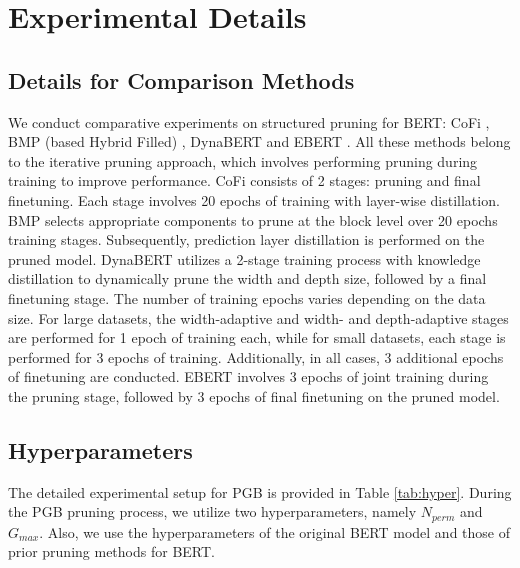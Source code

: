 \newpage

\setcounter{table}{0}
\setcounter{figure}{0}

\section{Experimental Details}\label{app:exdetail}
\subsection{Details for Comparison Methods}\label{app:compare}
We conduct comparative experiments on structured pruning for BERT: CoFi \cite{Xia}, BMP (based Hybrid Filled) \cite{block}, DynaBERT \cite{DynaBERT} and EBERT \cite{ebert}. All these methods belong to the iterative pruning approach, which involves performing pruning during training to improve performance. CoFi \cite{Xia} consists of 2 stages: pruning and final finetuning. Each stage involves 20 epochs of training with layer-wise distillation. BMP \cite{block} selects appropriate components to prune at the block level over 20 epochs training stages. Subsequently, prediction layer distillation is performed on the pruned model. DynaBERT \cite{DynaBERT} utilizes a 2-stage training process with knowledge distillation to dynamically prune the width and depth size, followed by a final finetuning stage. The number of training epochs varies depending on the data size. For large datasets, the width-adaptive and width- and depth-adaptive stages are performed for 1 epoch of training each, while for small datasets, each stage is performed for 3 epochs of training. Additionally, in all cases, 3 additional epochs of finetuning are conducted. EBERT \cite{ebert} involves 3 epochs of joint training during the pruning stage, followed by 3 epochs of final finetuning on the pruned model.

\subsection{Hyperparameters}\label{app:hyper}

The detailed experimental setup for PGB is provided in Table \ref{tab:hyper}. During the PGB pruning process, we utilize two hyperparameters, namely $N_{perm}$ and $G_{max}$. Also, we use the hyperparameters of the original BERT model and those of prior pruning methods for BERT.


